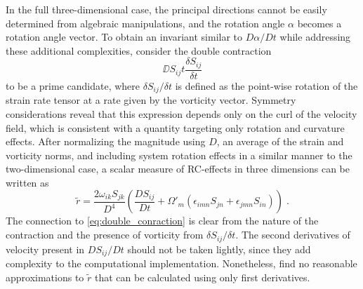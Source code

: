\documentclass[11pt]{article}
\begin{document}
In the full three-dimensional case, the principal directions cannot be easily determined from algebraic manipulations, and the rotation angle $\alpha$ becomes a rotation angle vector. To obtain an invariant similar to $D \alpha / D t$ while addressing these additional complexities, \citet{spalart1997} consider the double contraction 
\begin{equation}
\DD{S_{ij}}{t} \frac{\delta S_{ij}}{\delta t}
\label{eq:double_conraction}
\end{equation}
to be a prime candidate, where $\delta S_{ij} / \delta t$ is defined as the point-wise rotation of the strain rate tensor at a rate given by the vorticity vector. Symmetry considerations reveal that this expression depends only on the curl of the velocity field, which is consistent with a quantity targeting only rotation and curvature effects. After normalizing the magnitude using $D$, an average of the strain and vorticity norms, and including system rotation effects in a similar manner to the two-dimensional case, a scalar measure of RC-effects in three dimensions can be written as
\begin{equation}
\tilde{r} = \frac{2 \omega_{ik} S_{jk}}{D^4}
\left( \frac{D S_{ij}}{D t} + \Omega'_m (\epsilon_{imn} S_{jn} + \epsilon_{jmn} S_{in}) \right)
\;.
\end{equation}
The connection to \eqref{eq:double_conraction} is clear from the nature of the contraction and the presence of vorticity from $\delta S_{ij} / \delta t$. The second derivatives of velocity present in $D S_{ij} / D t$ should not be taken lightly, since they add complexity to the computational implementation. Nonetheless, \citet{spalart1997} find no reasonable approximations to $\tilde{r}$ that can be calculated using only first derivatives.
\end{document}
